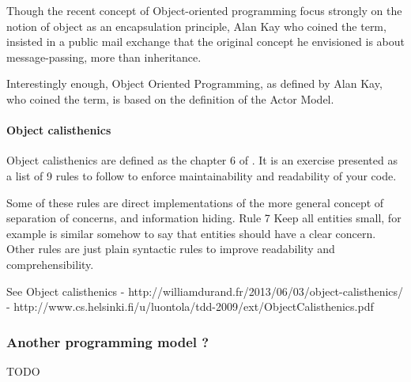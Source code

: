 Though the recent concept of Object-oriented programming focus strongly on the notion of object as an encapsulation principle, Alan Kay who coined the term, insisted in a public mail exchange that the original concept he envisioned is about message-passing, more than inheritance.

Interestingly enough, Object Oriented Programming, as defined by Alan Kay, who coined the term, is based on the definition of the Actor Model.



\paragraph{Object calisthenics}

Object calisthenics are defined as the chapter 6 of \cite{Bay2008}.
It is an exercise presented as a list of 9 rules to follow to enforce maintainability and readability of your code.

Some of these rules are direct implementations of the more general concept of separation of concerns, and information hiding.
Rule 7 Keep all entities small, for example is similar somehow to say that entities should have a clear concern.
Other rules are just plain syntactic rules to improve readability and comprehensibility.


See Object calisthenics 
- http://williamdurand.fr/2013/06/03/object-calisthenics/
- http://www.cs.helsinki.fi/u/luontola/tdd-2009/ext/ObjectCalisthenics.pdf



\subsubsection{Another programming model ?}

TODO



\endinput







Plan

A first part with the modularity, from Parnas with Information Hiding, to modularity, and design decision, and design structure matrix, and so on ...
To Object, with object calisthenics.
This part should show roughly the trend in software modularity.

A second part with the incompatibility between this modularity and parallelism.
This part might need to move into the reconciliation part.






